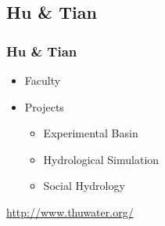 \documentclass{beamer}
\begin{document}
\begin{CJK}{UTF8}{gkai}
{  
 
  
  \section{Hu \& Tian}
  \frame
  {
  \frametitle{Hu \& Tian}
  \begin{itemize}
  \item Faculty
  \item Projects
    \begin{itemize}
    \item Experimental Basin
    \item Hydrological Simulation
    \item Social Hydrology
    \end{itemize}
  \end{itemize}
  \url{http://www.thuwater.org/}
  }
  
}
\end{CJK}
\end{document}

